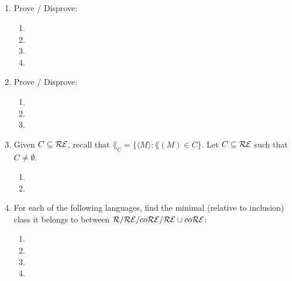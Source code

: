 \documentclass{article}
\title{
    \textmd{\bd{\hmwkClass:\ \hmwkTitle}}\\
}
\author{\hmwkAuthorName}
\begin{document}
\maketitle

\begin{enumerate}
      \item Prove / Disprove:
            \begin{enumerate}
                  \item 
                  \item 
                  \item 
                  \item 
            \end{enumerate}

            \pagebreak

      \item Prove / Disprove:
            \begin{enumerate}
                  \item \REV 
                  \item \REV 
                  \item 
            \end{enumerate}

            \pagebreak

      \item Given $C \subseteq \mathcal{R}\mathcal{E}$, recall that $\lang_C = \{\langle M \rangle : \lang(M) \in C\}$.
            Let $C \subseteq \mathcal{R}\mathcal{E}$ such that $ C \neq \emptyset$.
            \begin{enumerate}
                  \item \TODO 
                  \item \TODO 
            \end{enumerate}

            \pagebreak

      \item For each of the following languages, find the minimal (relative to inclusion)
            class it belongs to between $\mathcal{R}/\mathcal{R}\mathcal{E}/co\mathcal{R}\mathcal{E}/\mathcal{R}\mathcal{E} \cup co\mathcal{R}\mathcal{E}$:
            \begin{enumerate}
                  \item \TODO 
                  \item \TODO 
                  \item \TODO 
                  \item \TODO 
            \end{enumerate}


\end{enumerate}
\end{document}
